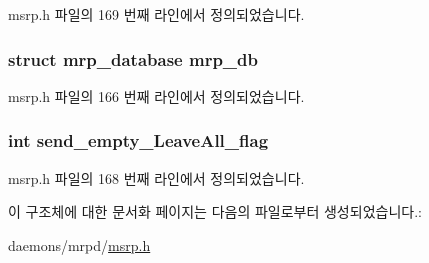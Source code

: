 msrp.\+h 파일의 169 번째 라인에서 정의되었습니다.

\subsubsection[{\texorpdfstring{mrp\+\_\+db}{mrp_db}}]{\setlength{\rightskip}{0pt plus 5cm}struct {\bf mrp\+\_\+database} mrp\+\_\+db}\hypertarget{structmsrp__database_a7e08db3b85c932325ce3a3605a09ab0c}{}\label{structmsrp__database_a7e08db3b85c932325ce3a3605a09ab0c}


msrp.\+h 파일의 166 번째 라인에서 정의되었습니다.

\subsubsection[{\texorpdfstring{send\+\_\+empty\+\_\+\+Leave\+All\+\_\+flag}{send_empty_LeaveAll_flag}}]{\setlength{\rightskip}{0pt plus 5cm}int send\+\_\+empty\+\_\+\+Leave\+All\+\_\+flag}\hypertarget{structmsrp__database_a5c551b6ff3976e96ec18e69b0706a532}{}\label{structmsrp__database_a5c551b6ff3976e96ec18e69b0706a532}


msrp.\+h 파일의 168 번째 라인에서 정의되었습니다.



이 구조체에 대한 문서화 페이지는 다음의 파일로부터 생성되었습니다.\+:\begin{DoxyCompactItemize}
\item 
daemons/mrpd/\hyperlink{msrp_8h}{msrp.\+h}\end{DoxyCompactItemize}
